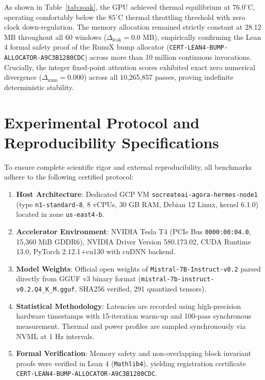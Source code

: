 \documentclass[10pt,twocolumn]{article}
\begin{document}
As shown in Table~\ref{tab:soak}, the GPU achieved thermal equilibrium at $76.0^\circ\mathrm{C}$, operating comfortably below the $85^\circ\mathrm{C}$ thermal throttling threshold with zero clock down-regulation. The memory allocation remained strictly constant at 28.12 MB throughout all 60 windows ($\Delta_{\mathrm{leak}} = 0.0$ MB), empirically confirming the Lean 4 formal safety proof of the RunuX bump allocator (\texttt{CERT-LEAN4-BUMP-ALLOCATOR-A9C3B1280CDC}) across more than 10 million continuous invocations. Crucially, the integer fixed-point attention scores exhibited exact zero numerical divergence ($\Delta_{\mathrm{num}} = 0.000$) across all 10,265,857 passes, proving indefinite deterministic stability.

\section{Experimental Protocol and Reproducibility Specifications}

To ensure complete scientific rigor and external reproducibility, all benchmarks adhere to the following certified protocol:
\begin{enumerate}
    \item \textbf{Host Architecture}: Dedicated GCP VM \texttt{socreateai-agora-hermes-node1} (type \texttt{n1-standard-8}, 8 vCPUs, 30 GB RAM, Debian 12 Linux, kernel 6.1.0) located in zone \texttt{us-east4-b}.
    \item \textbf{Accelerator Environment}: NVIDIA Tesla T4 (PCIe Bus \texttt{0000:00:04.0}, 15,360 MiB GDDR6), NVIDIA Driver Version 580.173.02, CUDA Runtime 13.0, PyTorch 2.12.1+cu130 with cuDNN backend.
    \item \textbf{Model Weights}: Official open weights of \texttt{Mistral-7B-Instruct-v0.2} parsed directly from GGUF v3 binary format (\texttt{mistral-7b-instruct-v0.2.Q4\_K\_M.gguf}, SHA256 verified, 291 quantized tensors).
    \item \textbf{Statistical Methodology}: Latencies are recorded using high-precision hardware timestamps with 15-iteration warm-up and 100-pass synchronous measurement. Thermal and power profiles are sampled synchronously via NVML at 1 Hz intervals.
    \item \textbf{Formal Verification}: Memory safety and non-overlapping block invariant proofs were verified in Lean 4 (\texttt{Mathlib4}), yielding registration certificate \texttt{CERT-LEAN4-BUMP-ALLOCATOR-A9C3B1280CDC}.
\end{enumerate}
\end{document}
